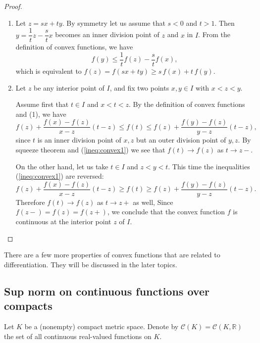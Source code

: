 \begin{proof}
  \begin{enumerate}[$(a)$]
    \item Let $z = sx + ty$.
      By symmetry let us assume that $s < 0$ and $t > 1$.
      Then $y = \dfrac1t z - \dfrac{s}{t} x$ becomes an inner division point of $z$ and $x$ in $I$.
      From the definition of convex functions, we have
      \[
	f(y) \leqslant \frac{1}{t} f(z) - \frac{s}{t} f(x),
      \]
      which is equivalent to $f(z) = f(sx+ty) \geqslant s \, f(x) + t \, f(y)$.

    \item Let $z$ be any interior point of $I$, and fix two points $x,y \in I$ with $x < z < y$.

      Assume first that $t \in I$ and $x < t < z$.  By the definition of convex functions and (1), we have
      \begin{equation}
	\label{ineq:convex1}
	f(z) + \frac{f(x)-f(z)}{x-z} (t-z) \leqslant f(t) \leqslant
	f(z) + \frac{f(y)-f(z)}{y-z} (t-z),
      \end{equation}
      since $t$ is an inner division point of $x,z$ but an outer division point of $y,z$.  By squeeze theorem and (\ref{ineq:convex1}) we see that $f(t) \to f(z)$ as $t \to z-$.

      On the other hand, let us take $t \in I$ and $z < y < t$.
      This time the inequalities (\ref{ineq:convex1}) are reversed:
      \begin{equation}
	\label{ineq:convex2}
	f(z) + \frac{f(x)-f(z)}{x-z} (t-z) \geqslant f(t) \geqslant
	f(z) + \frac{f(y)-f(z)}{y-z} (t-z).
      \end{equation}
      Therefore $f(t) \to f(z)$ as $t \to z+$ as well,
      Since $f(z-) = f(z) = f(z+)$, we conclude that the convex function $f$ is continuous at the interior point $z$ of $I$.
  \end{enumerate}
\end{proof}

There are a few more properties of convex functions that are related to differentiation.
They will be discussed in the later topics.

\subsection{Sup norm on continuous functions over compacts}

Let $K$ be a (nonempty) compact metric space.
Denote by $\mathcal{C}(K) = \mathcal{C}(K, \mathbb{R})$ the set of all continuous real-valued functions on $K$.

